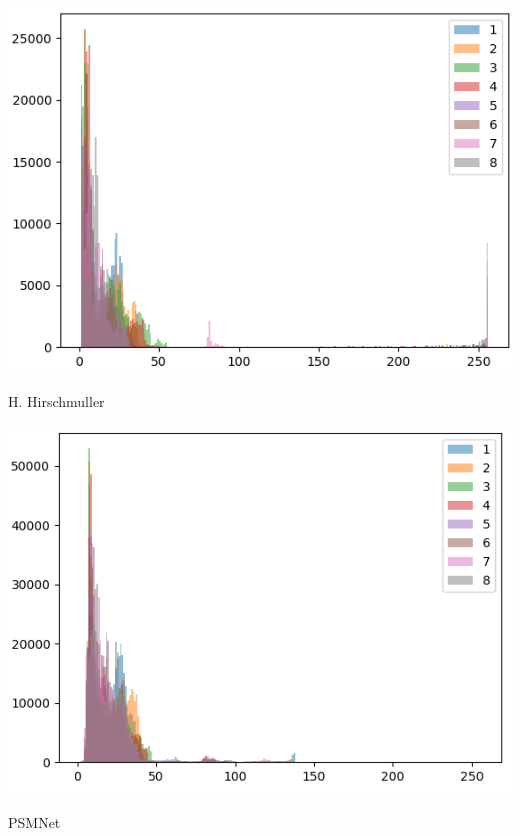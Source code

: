 \documentclass{article}
\begin{document}
	\begin{center}
		\begin{minipage}{0.33\linewidth}
		\includegraphics[width=\linewidth]{"../_submission/histogram-hirschmuller.png"}
		\begin{center}
			H. Hirschmuller
		\end{center}
		\end{minipage}%
		\hfill
		\begin{minipage}{0.33\linewidth}
		\includegraphics[width=\linewidth]{"../_submission/histogram-pyramid-matching.png"}
		\begin{center}
			PSMNet
		\end{center}
		\end{minipage}
		\hfill
		\begin{minipage}{0.33\linewidth}

\end{minipage}
\end{center}
\end{document}

